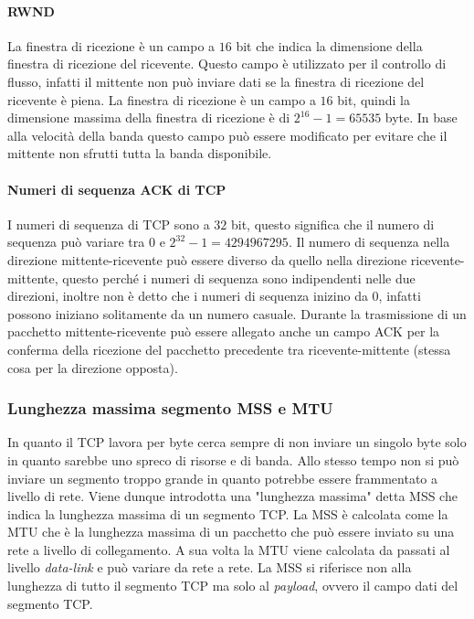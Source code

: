         \paragraph{\Acrfull*{RWND}} La finestra di ricezione è un campo a $16$ bit che indica la dimensione della finestra di ricezione del ricevente. Questo campo è utilizzato per il controllo di flusso, infatti il mittente non può inviare dati se la finestra di ricezione del ricevente è piena. La finestra di ricezione è un campo a $16$ bit, quindi la dimensione massima della finestra di ricezione è di $ 2^{16} - 1 = 65535 $ byte. In base alla velocità della banda questo campo può essere modificato per evitare che il mittente non sfrutti tutta la banda disponibile.
        \paragraph{Numeri di sequenza \Acrshort*{ACK} di \Acrshort*{TCP}} I numeri di sequenza di \Acrshort*{TCP} sono a $32$ bit, questo significa che il numero di sequenza può variare tra $ 0 $ e $ 2^{32} - 1 = 4294967295 $. Il numero di sequenza nella direzione mittente-ricevente può essere diverso da quello nella direzione ricevente-mittente, questo perché i numeri di sequenza sono indipendenti nelle due direzioni, inoltre non è detto che i numeri di sequenza inizino da $ 0 $, infatti possono iniziano solitamente da un numero casuale. Durante la trasmissione di un pacchetto mittente-ricevente può essere allegato anche un campo \Acrshort*{ACK} per la conferma della ricezione del pacchetto precedente tra ricevente-mittente (stessa cosa per la direzione opposta).
        \subsubsection{Lunghezza massima segmento \Acrshort*{MSS} e \Acrshort*{MTU}}
            In quanto il \Acrshort*{TCP} lavora per byte cerca sempre di non inviare un singolo byte solo in quanto sarebbe uno spreco di risorse e di banda. Allo stesso tempo non si può inviare un segmento troppo grande in quanto potrebbe essere frammentato a livello di rete. Viene dunque introdotta una "lunghezza massima" detta \acrfull*{MSS} che indica la lunghezza massima di un segmento \Acrshort*{TCP}. La \Acrshort*{MSS} è calcolata come la \Acrfull*{MTU} che è la lunghezza massima di un pacchetto che può essere inviato su una rete a livello di collegamento. A sua volta la \Acrshort*{MTU} viene calcolata da passati al livello \textit{data-link} e può variare da rete a rete. La \Acrshort*{MSS} si riferisce non alla lunghezza di tutto il segmento \Acrshort*{TCP} ma solo al \textit{payload}, ovvero il campo dati del segmento \Acrshort*{TCP}.
